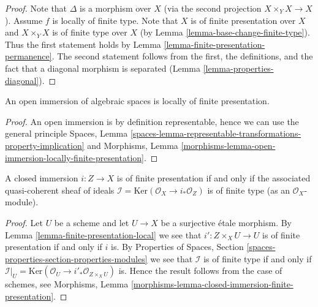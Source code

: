 \begin{proof}
Note that $\Delta$ is a morphism over $X$ (via the second
projection $X \times_Y X \to X$). Assume $f$ is locally of finite type.
Note that $X$ is of finite presentation over $X$ and $X \times_Y X$ is
of finite type over $X$ (by Lemma \ref{lemma-base-change-finite-type}).
Thus the first statement holds by
Lemma \ref{lemma-finite-presentation-permanence}.
The second statement follows from the first, the definitions, and
the fact that a diagonal morphism is separated
(Lemma \ref{lemma-properties-diagonal}).
\end{proof}

\begin{lemma}
\label{lemma-open-immersion-locally-finite-presentation}
An open immersion of algebraic spaces is locally of finite presentation.
\end{lemma}

\begin{proof}
An open immersion is by definition representable, hence we can
use the general principle
Spaces,
Lemma \ref{spaces-lemma-representable-transformations-property-implication}
and
Morphisms,
Lemma \ref{morphisms-lemma-open-immersion-locally-finite-presentation}.
\end{proof}

\begin{lemma}
\label{lemma-closed-immersion-finite-presentation}
A closed immersion $i : Z \to X$ is of finite presentation if and only if
the associated quasi-coherent sheaf of ideals
$\mathcal{I} = \text{Ker}(\mathcal{O}_X \to i_*\mathcal{O}_Z)$
is of finite type (as an $\mathcal{O}_X$-module).
\end{lemma}

\begin{proof}
Let $U$ be a scheme and let $U \to X$ be a surjective \'etale morphism.
By Lemma \ref{lemma-finite-presentation-local}
we see that $i' : Z \times_X U \to U$ is of finite presentation if and
only if $i$ is. By Properties of Spaces, Section
\ref{spaces-properties-section-properties-modules}
we see that $\mathcal{I}$ is of finite type if and only if
$\mathcal{I}|_U = \text{Ker}(\mathcal{O}_U \to i'_*\mathcal{O}_{Z \times_X U})$
is. Hence the result follows from the case of schemes, see Morphisms,
Lemma \ref{morphisms-lemma-closed-immersion-finite-presentation}.
\end{proof}








